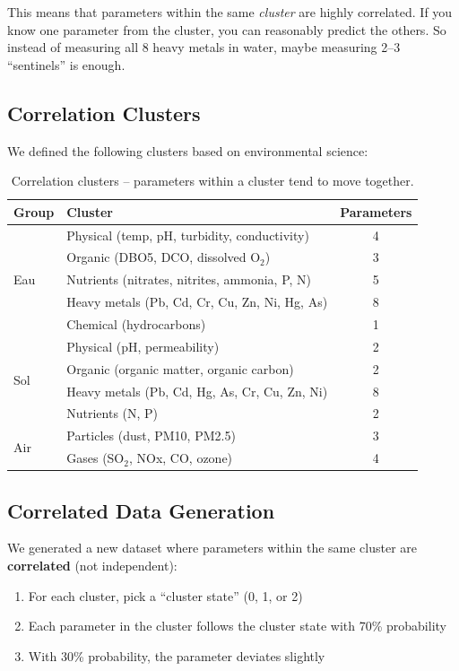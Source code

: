 \documentclass[12pt,a4paper]{article}
\begin{document}
This means that parameters within the same \textit{cluster} are highly correlated. If you know one parameter from the cluster, you can reasonably predict the others. So instead of measuring all 8 heavy metals in water, maybe measuring 2--3 ``sentinels'' is enough.

\subsection{Correlation Clusters}

We defined the following clusters based on environmental science:

\begin{table}[H]
\centering
\begin{tabular}{llc}
\toprule
\textbf{Group} & \textbf{Cluster} & \textbf{Parameters} \\
\midrule
\multirow{5}{*}{Eau} & Physical (temp, pH, turbidity, conductivity) & 4 \\
 & Organic (DBO5, DCO, dissolved O$_2$) & 3 \\
 & Nutrients (nitrates, nitrites, ammonia, P, N) & 5 \\
 & Heavy metals (Pb, Cd, Cr, Cu, Zn, Ni, Hg, As) & 8 \\
 & Chemical (hydrocarbons) & 1 \\
\midrule
\multirow{4}{*}{Sol} & Physical (pH, permeability) & 2 \\
 & Organic (organic matter, organic carbon) & 2 \\
 & Heavy metals (Pb, Cd, Hg, As, Cr, Cu, Zn, Ni) & 8 \\
 & Nutrients (N, P) & 2 \\
\midrule
\multirow{2}{*}{Air} & Particles (dust, PM10, PM2.5) & 3 \\
 & Gases (SO$_2$, NOx, CO, ozone) & 4 \\
\bottomrule
\end{tabular}
\caption{Correlation clusters -- parameters within a cluster tend to move together.}
\end{table}

\subsection{Correlated Data Generation}

We generated a new dataset where parameters within the same cluster are \textbf{correlated} (not independent):

\begin{enumerate}
    \item For each cluster, pick a ``cluster state'' (0, 1, or 2)
    \item Each parameter in the cluster follows the cluster state with 70\% probability
    \item With 30\% probability, the parameter deviates slightly
\end{enumerate}
\end{document}

